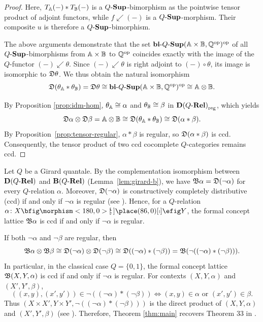 \documentclass{tac}
\begin{document}
\begin{proof}
Here, $T_{\mathbb{A}}(-)*T_{\mathbb{B}}(-)$ is a ${Q\text{-}\mathbf{Sup}}$-bimorphism as the pointwise tensor product of adjoint functors, while $f\swarrow(-)$ is a ${Q\text{-}\mathbf{Sup}}$-morphism. Their composite $u$ is therefore a ${Q\text{-}\mathbf{Sup}}$-bimorphism.

The above arguments demonstrate that the set $\mathbf{bi}\text{-}{Q\text{-}\mathbf{Sup}}(\mathbb{A}\times\mathbb{B},\mathbb{Q}^{\mathrm{op}})^{\mathrm{op}}$ of all ${Q\text{-}\mathbf{Sup}}$-bimorphisms from $\mathbb{A}\times\mathbb{B}$ to $\mathbb{Q}^{\mathrm{op}}$ coincides exactly with the image of the $Q$-functor $(-)\swarrow\theta$. Since $(-)\swarrow\theta$ is right adjoint to $(-)\circ\theta$, its image is isomorphic to $\mathfrak{D}\theta$. We thus obtain the natural isomorphism
\[
\mathfrak{D}(\theta_{\mathbb{A}}*\theta_{\mathbb{B}})=\mathfrak{D}\theta
\cong\mathbf{bi}\text{-}{Q\text{-}\mathbf{Sup}}(\mathbb{A}\times\mathbb{B},\mathbb{Q}^{\mathrm{op}})^{\mathrm{op}}
\cong\mathbb{A}\otimes\mathbb{B}.
\]

By Proposition \ref{prop:idm-hom}, $\theta_{\mathbb{A}}\cong\alpha$ and $\theta_{\mathbb{B}}\cong\beta$ in ${\mathbf{D}(Q\text{-}\mathbf{Rel})}_\mathrm{reg}$, which yields
\[
\mathfrak{D}\alpha\otimes\mathfrak{D}\beta=\mathbb{A}\otimes\mathbb{B}\cong\mathfrak{D}(\theta_{\mathbb{A}}\ast\theta_{\mathbb{B}})\cong\mathfrak{D}(\alpha*\beta).
\]
By Proposition~\ref{prop:tensor-regular}, $\alpha*\beta$ is regular, so $\mathfrak{D}(\alpha*\beta)$ is ccd. Consequently, the tensor product of two ccd cocomplete $Q$-categories remains ccd.
\end{proof}

\begin{remark}
Let \(Q\) be a Girard quantale. By the complementation isomorphism between \({\mathbf{D}(Q\text{-}\mathbf{Rel})}\) and \({\mathbf{B}(Q\text{-}\mathbf{Rel})}\) (Lemma~\ref{lem:girard-b}), we have \(\mathfrak{B}\alpha=\mathfrak{D}(\neg\alpha)\) for every \(Q\)-relation \(\alpha\). Moreover, \(\mathfrak{D}(\neg\alpha)\) is constructively completely distributive (ccd) if and only if \(\neg\alpha\) is regular (see \cite{LaiShen2018}). Hence, for a \(Q\)-relation \(\alpha\colon X\nto Y\), the formal concept lattice \(\mathfrak{B}\alpha\) is ccd if and only if \(\neg\alpha\) is regular.

If both \(\neg\alpha\) and \(\neg\beta\) are regular, then
\[
\mathfrak{B}\alpha\otimes\mathfrak{B}\beta
\cong\mathfrak{D}(\neg\alpha)\otimes\mathfrak{D}(\neg\beta)
\cong\mathfrak{D}((\neg\alpha)*(\neg\beta))
= \mathfrak{B}(\neg((\neg\alpha)*(\neg\beta))).
\]
In particular, in the classical case \(Q=\{0,1\}\), the formal concept lattice \(\mathfrak{B}(X,Y,\alpha)\) is ccd if and only if \(\neg\alpha\) is regular. For contexts \((X,Y,\alpha)\) and \((X',Y',\beta)\),
\[
((x,y),(x',y'))\in \neg((\neg\alpha)*(\neg\beta)) 
\iff (x,y)\in\alpha \text{ or } (x',y')\in\beta.
\]
Thus \((X\times X',Y\times Y',\neg((\neg\alpha)*(\neg\beta)))\) is the direct product of \((X,Y,\alpha)\) and \((X',Y',\beta)\) (see \cite[Section 1.3, Definition 32]{Ganter2024}). Therefore, Theorem \ref{thm:main} recovers Theorem 33 in \cite[Section 4.4]{Ganter2024}.
\end{remark}
\end{document}
